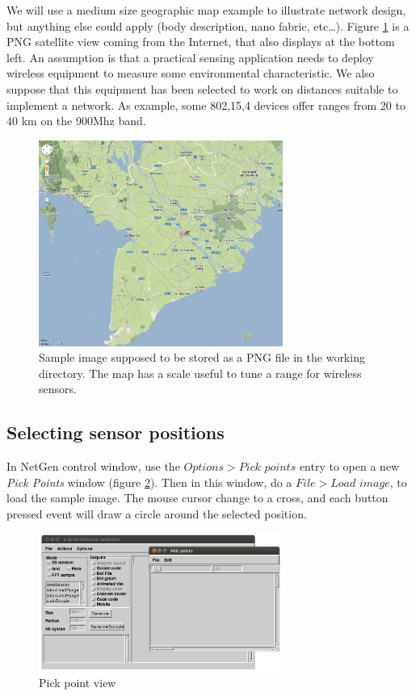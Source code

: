 \documentclass[times,a4paper]{book}
\begin{document}
We will use a medium size geographic map example to illustrate network design, 
but anything else could apply (body description, nano fabric, etc\ldots).
Figure \ref{fig:mekong} is a PNG satellite view coming from the Internet, that also displays
at the bottom left. An assumption is that a practical sensing application needs to deploy
wireless equipment to measure some environmental characteristic. We also suppose that
this equipment has been selected to work on distances suitable to implement a network.
As example, some 802,15,4 devices offer ranges from 20 to 40 km on the 900Mhz band.


\begin{figure}[hbtp]
\begin{center} 
\includegraphics[width=8cm]{mekong.png}
\caption{Sample image supposed to be stored as a PNG file in the working directory.
The map has a scale useful to  tune a  range for wireless sensors.}
\label{fig:mekong}
\end{center}
\end{figure}


\subsection{Selecting sensor positions}

In NetGen control window, use the $Options>Pick$ $points$ entry to  
open a new {\sl Pick Points} window (figure \ref{fig:PickPoint1}). Then in this window, do a $File>Load$ $image$,
to load the sample image. The mouse cursor change to a cross, and each 
button pressed event will draw a circle around the selected position.




\begin{figure}[hbtp]
\begin{center} 
\includegraphics[width=8cm]{PickPoints1.png}
\caption{Pick point view}
\label{fig:PickPoint1}
\end{center}
\end{figure}
\end{document}
